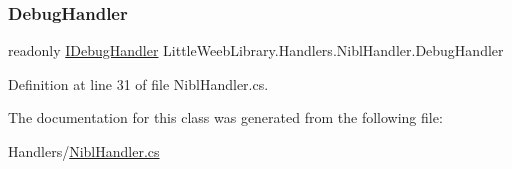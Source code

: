 \subsubsection{\texorpdfstring{Debug\+Handler}{DebugHandler}}
{\footnotesize\ttfamily readonly \mbox{\hyperlink{interface_little_weeb_library_1_1_handlers_1_1_i_debug_handler}{I\+Debug\+Handler}} Little\+Weeb\+Library.\+Handlers.\+Nibl\+Handler.\+Debug\+Handler\hspace{0.3cm}{\ttfamily [private]}}



Definition at line 31 of file Nibl\+Handler.\+cs.



The documentation for this class was generated from the following file\+:\begin{DoxyCompactItemize}
\item 
Handlers/\mbox{\hyperlink{_nibl_handler_8cs}{Nibl\+Handler.\+cs}}\end{DoxyCompactItemize}
